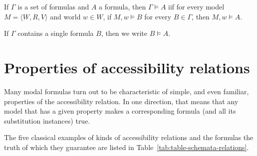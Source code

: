 \begin{definition}
  \label{semantic-entailment}
  If $\Gamma$ is a set of formulas and $A$ a formula, then
  $\Gamma \vDash A$ iif
  for every model $M = \langle W, R, V \rangle$ and world $w \in W$,
  if $M, w \vDash B$ for every $B \in \Gamma$, then $M, w \vDash A$.

  If $\Gamma$ contains a single formula $B$, then we write $B \vDash A$.
\end{definition}


\section{Properties of accessibility relations}

Many modal formulas turn out to be characteristic of simple, and
even familiar, properties of the accessibility relation. In one direction, 
that means that any model that has a given property makes a 
corresponding formula (and all its substitution instances) true. 

The five classical examples of kinds of accessibility 
relations and the formulas the truth of which they guarantee are 
listed in Table~\ref{tab:table-schemata-relations}.

